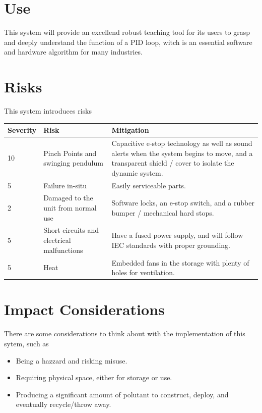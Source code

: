 \documentclass{article}
\begin{document}
\section{Use}

This system will provide an excellend robust teaching tool for its users to grasp and deeply
understand the function of a PID loop, witch is an essential software and hardware algorithm
for many industries.


\section{Risks}

This system introduces risks

\begin{tabular}{ |p{1.5cm}||p{3cm}|p{7.5cm}|  }
    \hline
    Severity & Risk                                       & Mitigation           \\
    \hline
    10       & Pinch Points and swinging pendulum         & Capacitive e-stop
    technology as well as sound alerts when the system begins to move, and a
    transparent shield / cover to isolate the dynamic system.                    \\
    \hline
    5        & Failure in-situ                            & Easily serviceable
    parts.
    \\
    \hline
    2        & Damaged to the unit from normal use        & Software locks, an
    e-stop switch, and a rubber bumper / mechanical hard stops.
    \\
    \hline
    5        & Short circuits and electrical malfunctions & Have a fused power
    supply, and will follow IEC standards with proper grounding.
    \\
    \hline
    5        & Heat                                       & Embedded fans in the
    storage with plenty of holes for ventilation.
    \\
    \hline
\end{tabular}


\section{Impact Considerations}

There are some considerations to think about with the implementation of this
sytem, such as

\begin{itemize}
    \item Being a hazzard and risking misuse.
    \item Requiring physical space, either for storage or use.
    \item Producing a significant amount of polutant to construct, deploy, and
          eventually recycle/throw away.
\end{itemize}
\end{document}
